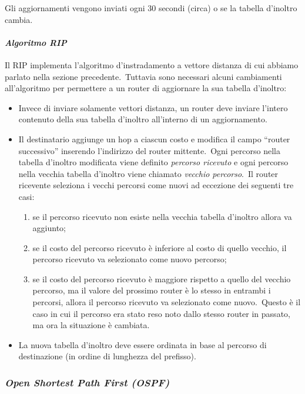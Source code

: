 Gli aggiornamenti vengono inviati ogni 30 secondi (circa) o se la tabella d'inoltro cambia.

\paragraph{\emph{Algoritmo RIP}}

Il RIP implementa l'algoritmo d'instradamento a vettore distanza di cui abbiamo parlato nella sezione precedente.\
Tuttavia sono necessari alcuni cambiamenti all'algoritmo per permettere a un router di aggiornare la sua tabella d'inoltro:
\begin{itemize}
    \item Invece di inviare solamente vettori distanza, un router deve inviare l'intero contenuto della sua tabella d'inoltro all'interno di un aggiornamento.
    \item Il destinatario aggiunge un hop a ciascun costo e modifica il campo ``router successivo'' inserendo l'indirizzo del router mittente.\
          Ogni percorso nella tabella d'inoltro modificata viene definito \emph{percorso ricevuto} e ogni percorso nella vecchia tabella d'inoltro viene chiamato \emph{vecchio percorso}.\
          Il router ricevente seleziona i vecchi percorsi come nuovi ad eccezione dei seguenti tre casi:
          \begin{enumerate}
              \item se il percorso ricevuto non esiste nella vecchia tabella d'inoltro allora va aggiunto;
              \item se il costo del percorso ricevuto è inferiore al costo di quello vecchio, il percorso ricevuto va selezionato come nuovo percorso;
              \item se il costo del percorso ricevuto è maggiore rispetto a quello del vecchio percorso, ma il valore del prossimo router è lo stesso in entrambi i percorsi, allora il percorso ricevuto va selezionato come nuovo.\
                    Questo è il caso in cui il percorso era stato reso noto dallo stesso router in passato, ma ora la situazione è cambiata.
          \end{enumerate}
    \item La nuova tabella d'inoltro deve essere ordinata in base al percorso di destinazione (in ordine di lunghezza del prefisso).
\end{itemize}

\subsubsection{\emph{Open Shortest Path First (OSPF)}}

